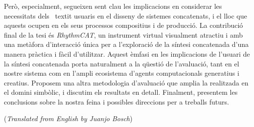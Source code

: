 Però, especialment, segueixen sent clau les implicacions en considerar les necessitats dels \ textit {usuaris} en el disseny de sistemes concatenats, i el lloc que aquests ocupen en els seus processos compositius i de producció. La contribució final de la tesi és \textit{RhythmCAT}, un instrument virtual visualment atractiu i amb una metàfora d'interacció única per a l'exploració de la síntesi concatenada d'una manera pràctica i fàcil d'utilitzar. Aquest èmfasi en les implicacions de l'usuari de la síntesi concatenada porta naturalment a la qüestió de l'avaluació, tant en el nostre sistema com en l'ampli ecosistema d'agents computacionals generatius i creatius. Proposem una altra metodologia d'avaluació que amplia la realitzada en el domini simbòlic, i discutim els resultats en detall. Finalment, presentem les conclusions sobre la nostra feina i possibles direccions per a treballs futurs.


\vfill
{\noindent (\emph{Translated from English by Juanjo Bosch})}